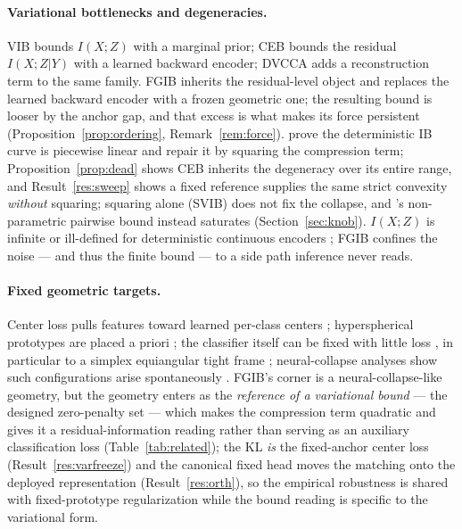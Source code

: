 \documentclass{article} %
\begin{document}
\paragraph{Variational bottlenecks and degeneracies.}
VIB \citep{alemi2017vib} bounds $I(X;Z)$ with a marginal prior; CEB
\citep{fischer2020ceb} bounds the residual $I(X;Z|Y)$ with a learned backward encoder;
DVCCA \citep{abdelaleem2025dvmib} adds a reconstruction term to the same family. FGIB
inherits the residual-level object and replaces the learned backward encoder with a
frozen geometric one; the resulting bound is looser by the anchor gap, and that excess
is what makes its force persistent (Proposition~\ref{prop:ordering},
Remark~\ref{rem:force}). \citet{kolchinsky2019caveats} prove the deterministic IB
curve is piecewise linear and repair it by squaring the compression term;
Proposition~\ref{prop:dead} shows CEB inherits the degeneracy over its entire range,
and Result~\ref{res:sweep} shows a fixed reference supplies the same strict convexity
\emph{without} squaring; squaring alone (SVIB) does not fix the collapse, and
\citet{kolchinsky2019nib}'s non-parametric pairwise bound instead saturates
(Section~\ref{sec:knob}). $I(X;Z)$ is infinite or ill-defined for deterministic
continuous encoders \citep{amjad2020learning,kolchinsky2019nib,saxe2018information};
FGIB confines the noise --- and thus the finite bound --- to a side path inference
never reads.

\paragraph{Fixed geometric targets.}
Center loss pulls features toward learned per-class centers \citep{wen2016center};
hyperspherical prototypes are placed a priori \citep{mettes2019hpn}; the classifier
itself can be fixed with little loss \citep{hoffer2018fix}, in particular to a simplex
equiangular tight frame \citep{zhu2021geometric,pernici2019regular}; neural-collapse
analyses show such configurations arise spontaneously \citep{papyan2020prevalence}.
FGIB's corner is a neural-collapse-like geometry, but the geometry enters as the
\emph{reference of a variational bound} --- the designed zero-penalty set --- which
makes the compression term quadratic and gives it a residual-information reading
rather than serving as an auxiliary classification loss (Table~\ref{tab:related});
the KL \emph{is} the fixed-anchor center loss (Result~\ref{res:varfreeze}) and the
canonical fixed head moves the matching onto the deployed representation
(Result~\ref{res:orth}), so the empirical robustness is shared with fixed-prototype
regularization while the bound reading is specific to the variational form.
\end{document}
